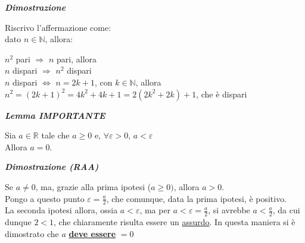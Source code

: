 \documentclass{article}
\theoremstyle{definition}
\newcommand{\N}{\mathbb{N}}
\begin{document}
\begin{itemize}
\begin{center}
\begin{itemize}
\begin{center}
    \textbf{\textit{Dimostrazione}}
\end{center}Riscrivo l'affermazione come:
\\
dato $n \in \N$, allora:
\begin{center}
    $n^2$ pari $\Longrightarrow$ $n$ pari, allora \\
    $n$ dispari $\Longrightarrow$ $n^2$ dispari \\
    $n$ dispari $\Longleftrightarrow$ $n=2k+1$, con $k \in \N$, allora $n^2=(2k+1)^2=4k^2+4k+1=2(2k^2+2k)+1$, che è dispari
\end{center}










            \begin{center}
                \textit{\textbf{Lemma IMPORTANTE}}
            \end{center}
            Sia $a \in \mathbb{R}$ tale che $a \geqslant 0$ e, $\forall \varepsilon > 0$,  $a < \varepsilon$\\
            Allora $a=0$.
            \begin{center}
               \textbf{\textit{Dimostrazione (RAA)}}
            \end{center}
            Se $a \neq 0$, ma, grazie alla prima ipotesi ($a \geqslant 0)$, allora $a > 0$.
            \\ Pongo a questo punto $\varepsilon = \frac{a}{2}$, che comunque, data la prima ipotesi, è positivo.
            \\ La seconda ipotesi allora, ossia $a<\varepsilon$, ma per $a<\varepsilon=\frac{a}{2}$, si avrebbe $a<\frac{a}{2}$, da cui dunque $2<1$, che chiaramente risulta essere un \underline{assurdo}.
            In questa maniera si è dimostrato che $a$ \underline{\textbf{deve essere}} $=0$
        \end{itemize}
    \end{center}

\newpage

\end{itemize}
\end{document}

